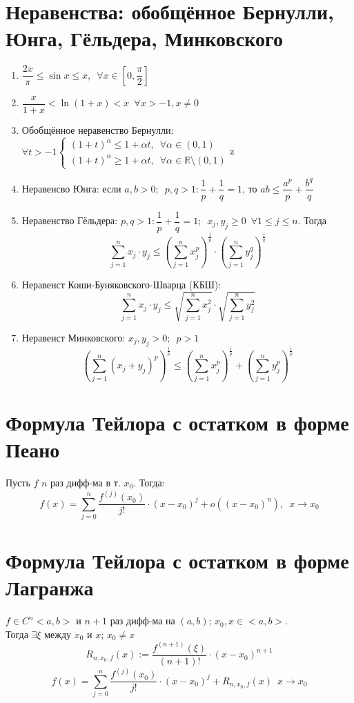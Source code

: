 \documentclass[11pt, a4paper]{article}
\def\R{\mathbb{R}}
\def\sp{\, \, \,}
\begin{document}
    \section{Неравенства: обобщённое Бернулли, Юнга, Гёльдера, Минковского}
    \begin{enumerate}
        \item $\dfrac{2x}{\pi} \leq \sin x \leq x,\sp \forall x \in \left[0, \dfrac{\pi}{2}\right]$
        \item $\dfrac{x}{1+x} < \ln (1+x) < x \sp \forall x > -1, x \neq 0$
        \item Обобщённое неравенство Бернулли: $\forall t > -1
        \begin{cases}
            (1+t)^{\alpha} \leq 1 + \alpha t, \sp \forall \alpha \in (0,1)\\
            (1+t)^{\alpha} \geq 1 + \alpha t, \sp \forall \alpha \in \R \setminus (0,1)
        \end{cases}$z
        \item Неравенсво Юнга: если $a, b > 0; \sp p, q > 1 : \dfrac{1}{p} + \dfrac{1}{q} = 1$, то $ab \leq \dfrac{a^p}{p} + \dfrac{b^q}{q}$
        \item Неравенство Гёльдера: $p,q > 1: \dfrac{1}{p} + \dfrac{1}{q} = 1; \sp x_j, y_j \geq 0 \sp \forall 1 \leq j \leq n$. Тогда
        $$\sum_{j=1}^nx_j \cdot y_j \leq \left(\sum_{j=1}^n x_j^p\right)^{\frac{1}{p}} \cdot \left(\sum_{j=1}^n y_j^q\right)^{\frac{1}{q}}$$

        \item Неравенст Коши-Буняковского-Шварца (КБШ):
        $$\sum_{j=1}^nx_j \cdot y_j \leq \sqrt{\sum_{j=1}^n x_j^2} \cdot \sqrt{\sum_{j=1}^n y_j^2}$$

        \item Неравенст Минковского: $x_j, y_j > 0; \sp p > 1$
        $$\left(\sum_{j=1}^n (x_j + y_j)^p\right)^{\frac{1}{p}} \leq \left(\sum_{j=1}^n x_j^p\right)^{\frac{1}{p}} + \left(\sum_{j=1}^n y_j^p\right)^{\frac{1}{p}}$$
    \end{enumerate}

    \section{Формула Тейлора с остатком в форме Пеано}
    Пусть $f$ $n$ раз дифф-ма в т. $x_0$. Тогда:
    $$f(x) = \sum_{j = 0}^n \frac{f^{(j)}(x_0)}{j!} \cdot (x-x_0)^j + o((x-x_0)^n), \sp x \to x_0$$

    \section{Формула Тейлора с остатком в форме Лагранжа}
    $f \in C^n<a, b>$ и $n+1$ раз дифф-ма на $(a, b)$; $x_0, x \in <a,b>$.\\
    Тогда $\exists \xi$ между $x_0$ и $x$; $x_0 \neq x$\\
    $$R_{n, x_0, f}(x) := \frac{f^{(n+1)}(\xi)}{(n+1)!} \cdot (x-x_0)^{n+1}$$
    $$f(x) = \sum_{j = 0}^n \frac{f^{(j)}(x_0)}{j!} \cdot (x-x_0)^j + R_{n, x_0, f}(x) \sp x \to x_0$$
\end{document}
